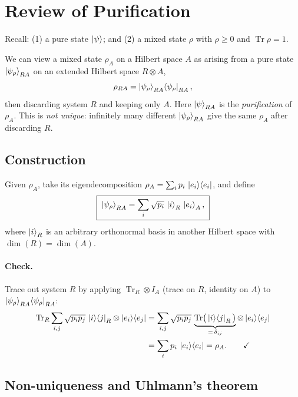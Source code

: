 \documentclass[11pt]{article}
\newcommand{\Tr}{\operatorname{Tr}}
\begin{document}
\section{Review of Purification}

Recall: (1) a pure state $\ket{\psi}$; and (2) a mixed state $\rho$ with
$\rho\ge 0$ and $\Tr\rho=1$.

We can view a mixed state $\rho_A$ on a Hilbert space $A$ as arising from a
pure state $\ket{\psi_\rho}_{RA}$ on an extended Hilbert space $R\otimes A$,
\[
\rho_{RA} = \ket{\psi_\rho}_{RA}\!\bra{\psi_\rho}_{RA},
\]
then discarding system $R$ and keeping only $A$. Here $\ket{\psi}_{RA}$ is the
\emph{purification} of $\rho_A$. This is \emph{not unique}: infinitely many
different $\ket{\psi_\rho}_{RA}$ give the same $\rho_A$ after discarding $R$.

\subsection{Construction}

Given $\rho_A$, take its eigendecomposition
$\rho_A = \sum_i p_i\,\ket{e_i}\!\bra{e_i}$, and define
\[
\boxed{\;
\ket{\psi_\rho}_{RA} = \sum_i \sqrt{p_i}\,\ket{i}_R\,\ket{e_i}_A,
\;}
\]
where $\ket{i}_R$ is an arbitrary orthonormal basis in another Hilbert space
with $\dim(R)=\dim(A)$.

\paragraph{Check.}
Trace out system $R$ by applying $\Tr_R \otimes I_A$ (trace on $R$, identity on
$A$) to $\ket{\psi_\rho}_{RA}\!\bra{\psi_\rho}_{RA}$:
\begin{align*}
\Tr_R \sum_{i,j} \sqrt{p_i p_j}\,\ket{i}\!\bra{j}_R \otimes \ket{e_i}\!\bra{e_j}
&= \sum_{i,j} \sqrt{p_i p_j}\,
\underbrace{\Tr\!\big(\ket{i}\!\bra{j}_R\big)}_{=\,\delta_{ij}}
\otimes \ket{e_i}\!\bra{e_j}\\
&= \sum_i p_i\,\ket{e_i}\!\bra{e_i} = \rho_A. \qquad\checkmark
\end{align*}

\subsection{Non-uniqueness and Uhlmann's theorem}
\end{document}
